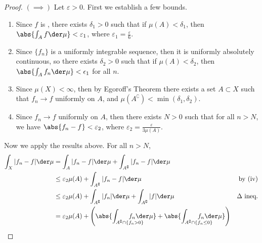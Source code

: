 \documentclass[12pt,letterpaper]{article}
\begin{document}
\pagebreak
{}
%
\begin{proof}$(\implies)$
Let $\varepsilon>0$. First we establish a few bounds.
\begin{enumerate}[label=(\roman*)]
\item Since $f$ is \musummable{}, there exists $\delta_1>0$ such that if $\mu(A)<\delta_1$, then $\abs{ \int_A f\der\mu}<\varepsilon_1$, where $\varepsilon_1=\frac{\varepsilon}{6}$.
\item Since $\{f_n\}$ is a uniformly integrable sequence, then it is uniformly absolutely continuous, so there exists $\delta_2>0$ such that if $\mu(A)<\delta_2$, then $\abs{\int_A f_n \der\mu}<\epsilon_1$ for all $n$. 
\item Since $\mu(X)<\infty$, then by Egoroff's Theorem there exists a set $A\subset X$ such that $f_n \to f$ uniformly on $A$, and $\mu(A^\complement)<\min(\delta_1, \delta_2)$. 
\item Since $f_n\to f$ uniformly on $A$, then there exists $N>0$ such that for all $n>N$, we have $\abs{f_n-f}<\varepsilon_2$, where $\varepsilon_2=\frac{\varepsilon}{3\mu(A)}$. 
\end{enumerate}
Now we apply the results above. For all $n>N$, 
\begin{align*}
\int_X|f_n-f|\der\mu 
&= \int_A|f_n-f|\der\mu + \int_{A^\complement}|f_n-f|\der\mu \\
&\leq \varepsilon_2\mu(A) + \int_{A^\complement}|f_n-f|\der\mu & \text{by (iv)}\\
&\leq \varepsilon_2\mu(A) + \int_{A^\complement}|f_n|\der\mu + \int_{A^\complement}|f|\der\mu & \Delta \text{ ineq.} \\
&= \varepsilon_2\mu(A) 
  + \left( \abs{\int_{A^\complement\cap\{f_n >   0\} }\hspace*{-2.5em}f_n\der\mu} +  \abs{\int_{A^\complement\cap\{f_n\leq 0\} }\hspace*{-2.5em}f_n\der\mu} \right) 

\end{align*}
\end{proof}
\end{document}
